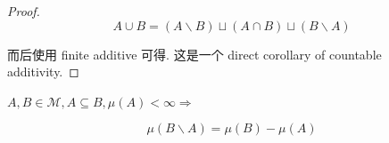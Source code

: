 \documentclass{qlnotes-export}
\begin{document}
\begin{proof}

\[A \cup B = (A\backslash B) \sqcup (A \cap B) \sqcup (B\backslash A)\]

而后使用 finite additive 可得. 这是一个 direct corollary of countable additivity.

\end{proof}

\begin{corollary}\label{cor-01-sigma-algebra-measure-corollary-003}

\(A,B \in \mathcal{M},A \subseteq B,\mu(A) < \infty\Longrightarrow\)

\[\mu(B\backslash A) = \mu(B) - \mu(A)\]

\end{corollary}
\end{document}
